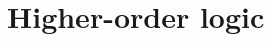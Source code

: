 \chapter{Higher-order logic}\label{sec:higher_order_logic}

\begin{definition}\label{def:higher_order_logic}
  \todo{}
\end{definition}
